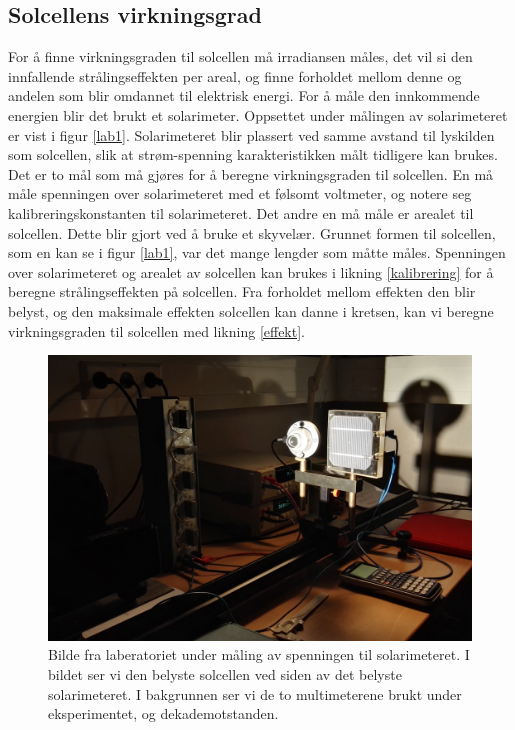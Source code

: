 \documentclass[%
 reprint,
 amsmath,amssymb,
 aps,
 norsk,
 booktabs
]{revtex4-1}
\begin{document}
\subsection{Solcellens virkningsgrad}
For å finne virkningsgraden til solcellen må irradiansen måles, det vil si den innfallende strålingseffekten per areal, og finne forholdet mellom denne og andelen som blir omdannet til elektrisk energi. For å måle den innkommende energien blir det brukt et solarimeter. Oppsettet under målingen av solarimeteret er vist i figur \vref{lab1}. Solarimeteret blir plassert ved samme avstand til lyskilden som solcellen, slik at strøm-spenning karakteristikken målt tidligere kan brukes. Det er to mål som må gjøres for å beregne virkningsgraden til solcellen. En må måle spenningen over solarimeteret med et følsomt voltmeter, og notere seg kalibreringskonstanten til solarimeteret. Det andre en må måle er arealet til solcellen. Dette blir gjort ved å bruke et skyvelær. Grunnet formen til solcellen, som en kan se i figur \vref{lab1}, var det mange lengder som måtte måles. Spenningen over solarimeteret og arealet av solcellen kan brukes i likning \eqref{kalibrering} for å beregne strålingseffekten på solcellen. Fra forholdet mellom effekten den blir belyst, og den maksimale effekten solcellen kan danne i kretsen, kan vi beregne virkningsgraden til solcellen med likning \eqref{effekt}.
\begin{figure}[h!]
  \centering
  \includegraphics[scale=0.065]{lab1.jpg}
  \caption{Bilde fra laberatoriet under måling av spenningen til solarimeteret. I bildet ser vi den belyste solcellen ved siden av det belyste solarimeteret. I bakgrunnen ser vi de to multimeterene brukt under eksperimentet, og dekademotstanden.}
  \label{lab1}
\end{figure}
\end{document}
